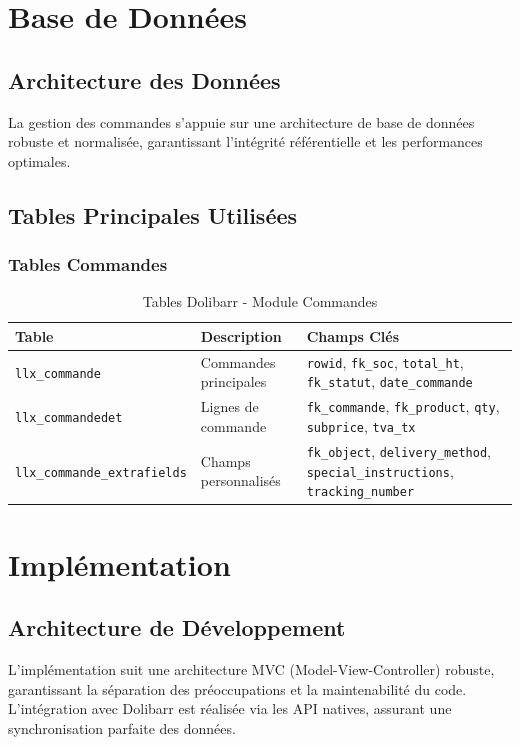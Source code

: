 \documentclass[12pt,a4paper]{report}
\begin{document}
\section{Base de Données}
\subsection{Architecture des Données}
La gestion des commandes s'appuie sur une architecture de base de données robuste et normalisée, garantissant l'intégrité référentielle et les performances optimales.

\subsection{Tables Principales Utilisées}

\subsubsection{Tables Commandes}
\begin{table}[H]
\centering
\begin{tabularx}{\textwidth}{|X|X|X|}
\hline
\textbf{Table} & \textbf{Description} & \textbf{Champs Clés} \\
\hline
\texttt{llx\_commande} & Commandes principales & \texttt{rowid}, \texttt{fk\_soc}, \texttt{total\_ht}, \texttt{fk\_statut}, \texttt{date\_commande} \\
\hline
\texttt{llx\_commandedet} & Lignes de commande & \texttt{fk\_commande}, \texttt{fk\_product}, \texttt{qty}, \texttt{subprice}, \texttt{tva\_tx} \\
\hline
\texttt{llx\_commande\_extrafields} & Champs personnalisés & \texttt{fk\_object}, \texttt{delivery\_method}, \texttt{special\_instructions}, \texttt{tracking\_number} \\
\hline
\end{tabularx}
\caption{Tables Dolibarr - Module Commandes}
\end{table}






\section{Implémentation}
\subsection{Architecture de Développement}
L'implémentation suit une architecture MVC (Model-View-Controller) robuste, garantissant la séparation des préoccupations et la maintenabilité du code. L'intégration avec Dolibarr est réalisée via les API natives, assurant une synchronisation parfaite des données.
\end{document}
